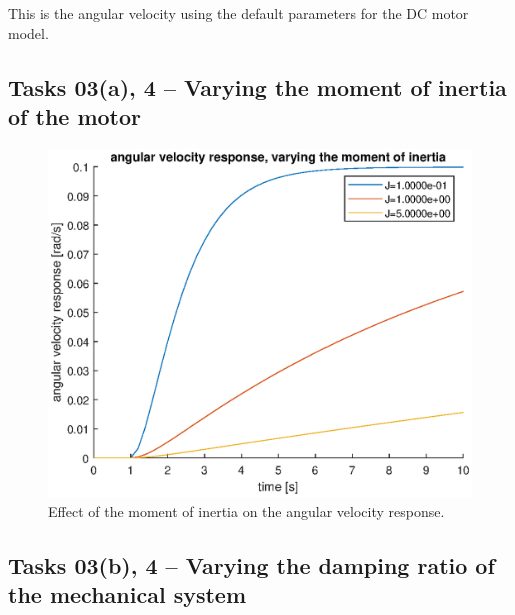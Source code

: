 \documentclass[12pt]{article}
\begin{document}
This is the angular velocity using the default parameters for the DC motor model.

\subsection{Tasks 03(a), 4 -- Varying the moment of inertia of the motor}\label{moment of inertia, task}

\begin{figure}
    \centering
    \includegraphics[width=\linewidth]{img/task03a_varying_moment_of_inertia.eps}
    \caption{Effect of the moment of inertia on the angular velocity response.}
    \label{fig:moment of inertia on angular velocity}
\end{figure}

\subsection{Tasks 03(b), 4 -- Varying the damping ratio of the mechanical system}\label{mechanical sys damping ratio, task}
\end{document}
